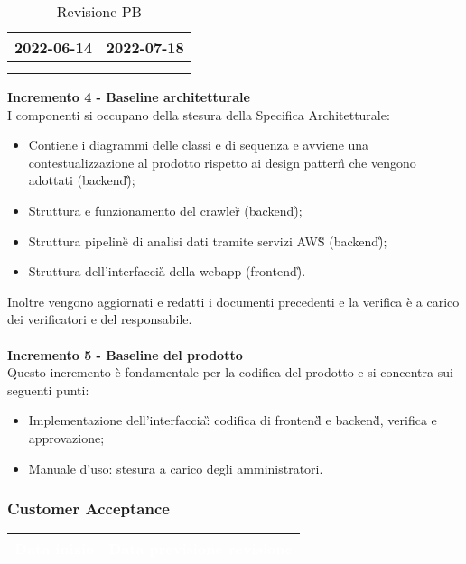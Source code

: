 {{{\begin{longtable}{C{.4\freewidth} C{.4\freewidth}}
        2022-06-14 & 2022-07-18 \\
        \bottomrule
        \\
        \caption{Revisione PB}
        \end{longtable}
    \textbf{Incremento 4 - Baseline architetturale} \\
    I componenti si occupano della stesura della Specifica Architetturale: 
    \begin{itemize}
        \item Contiene i diagrammi delle classi e di sequenza e avviene una contestualizzazione al prodotto rispetto ai design pattern\G{} che vengono adottati (backend\G);
        \item Struttura e funzionamento del crawler\G{} (backend\G);
        \item Struttura pipeline\G{} di analisi dati tramite servizi AWS\G{} (backend\G);
        \item Struttura dell'interfaccia\G{} della webapp (frontend\G).
    \end{itemize}
    Inoltre vengono aggiornati e redatti i documenti precedenti e la verifica è a carico dei verificatori e del responsabile.\\ \\
    \textbf{Incremento 5 - Baseline del prodotto} \\
    Questo incremento è fondamentale per la codifica del prodotto e si concentra sui seguenti punti:
    \begin{itemize}
        \item Implementazione dell'interfaccia\G: codifica di frontend\G{} e backend\G{}, verifica e approvazione;
        \item Manuale d'uso: stesura a carico degli amministratori.
    \end{itemize}
    }
\newpage
    \subsubsection{Customer Acceptance} {
        \setlength{\freewidth}{\dimexpr\textwidth-30\tabcolsep}
        \renewcommand{\arraystretch}{1.0}
        \setlength{\aboverulesep}{0pt}
        \setlength{\belowrulesep}{0pt}
        \begin{longtable}{C{.4\freewidth} C{.4\freewidth}}
        \toprule
        \textcolor{white}{\textbf{Data inizio}}&
        \textcolor{white}{\textbf{Data previsione revisione}} \\
        \toprule
        \endhead
            

\end{longtable}}}}
